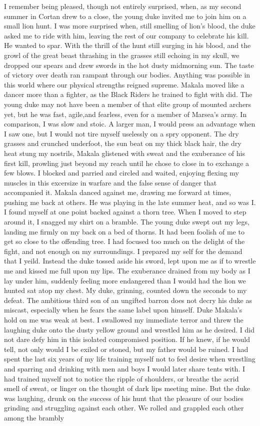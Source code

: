 \documentclass{article}
\begin{document}
I remember being pleased, though not entirely surprised, when, as my second summer in Cortan drew to a close, the young duke invited me to join him on a small lion hunt. I was more surprised when, still smelling of lion's blood, the duke asked me to ride with him, leaving the rest of our company to celebrate his kill. He wanted to spar. With the thrill of the hunt still surging in his blood, and the growl of the great beast thrashing in the grasses still echoing in my skull, we dropped our spears and drew swords in the hot dusty midmorning sun. The taste of victory over death ran rampant through our bodies. Anything was possible in this world where our physical strengths reigned supreme. Makala moved like a dancer more than a fighter, as the Black Riders he trained to fight with did. The young duke may not have been a member of that elite group of mounted archers yet, but he was fast, agile,and fearless, even for a member of Marsea's army. In comparison, I was slow and stoic. A larger man, I would press an advantage when I saw one, but I would not tire myself uselessly on a spry opponent. The dry grasses and crunched underfoot, the sun beat on my thick black hair, the dry heat stung my nostrils, Makala glistened with sweat and the exuberance of his first kill, prowling just beyond my reach until he chose to close in to exchange a few blows. I blocked and parried and circled and waited, enjoying flexing my muscles in this excersize in warfare and the false sense of danger that accompanied it. Makala danced against me, drawing me forward at times, pushing me back at others. He was playing in the late summer heat, and so was I. I found myself at one point backed against a thorn tree. When I moved to step around it, I snagged my shirt on a bramble. The young duke swept out my legs, landing me firmly on my back on a bed of thorns. It had been foolish of me to get so close to the offending tree. I had focused too much on the delight of the fight, and not enough on my surroundings. I prepared my self for the demand that I yeild. Instead the duke tossed aside his sword, lept upon me as if to wrestle me and kissed me full upon my lips. The exuberance drained from my body as I lay under him, suddenly feeling more endangered than I would  had the lion we hunted sat atop my chest. My duke, grinning, counted down the seconds to my defeat. The ambitious third son of an ungifted barron does not decry his duke as miscast, especially when he fears the same label upon himself. Duke Makala's hold on me was weak at best. I swallowed my immediate terror and threw the laughing duke onto the dusty yellow ground and wrestled him as he desired. I did not dare defy him in this isolated compromised position. If he knew, if he would tell, not only would I be exiled or stoned, but my father would be ruined. I had spent the last six years of my life training myself not to feel desire when wrestling and sparring and drinking with men and boys I would later share tents with. I had trained myself not to notice the ripple of shoulders, or breathe the acrid smell of sweat, or linger on the thought of dark lips meeting mine. But the duke was laughing, drunk on the success of his hunt that the pleasure of our bodies grinding and struggling against each other. We rolled and grappled each other among the brambly 
\end{document}
